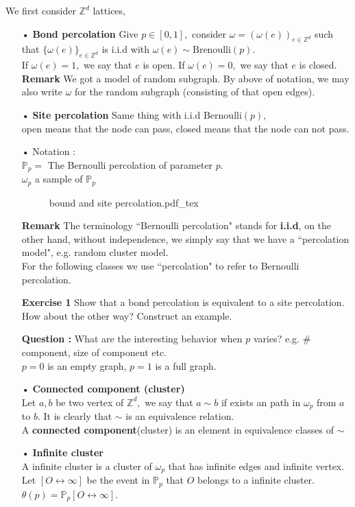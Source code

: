 \documentclass[12pt,a4paper]{article}
\newcommand{\incfig}[1]{%
{#1.pdf_tex}
}
\begin{document}
\begin{flushleft}
We first consider $\mathbb{Z}^d$ lattices,
\begin{enumerate}
	\item[•] \textbf{Bond percolation} Give $p\in [0,1],$ consider $\omega=(\omega(e))_{e\in\mathbb{Z}^d}$ such that $\{\omega(e)\}_{e\in\mathbb{Z}^d}$ is i.i.d with $\omega(e)\sim\mathrm{Brenoulli}(p).$\\
	If $\omega(e)=1,$ we say that $e$ is open. If $\omega(e)=0,$ we say that $e$ is closed.\\
	\textbf{Remark} We got a model of random subgraph. By above of notation, we may also write $\omega$ for the random subgraph (consisting of that open edges).
	\item[•] \textbf{Site percolation} Same thing with i.i.d $\mathrm{Bernoulli}(p),$\\
	open means that the node can pass, closed means that the node can not pass.
	\item[•] Notation : \\
	$\mathbb{P}_p=$ The Bernoulli percolation of parameter $p.$\\
	$\omega_p$ a sample of $\mathbb{P}_p$
	\begin{figure}[htp]
	\centering
	\def\svgwidth{15cm}
	\incfig{bound and site percolation}
	\end{figure}
	\item[\textbf{Remark}] The terminology ``Bernoulli percolation" stands for \textbf{i.i.d}, on the other hand, without independence, we simply say that we have a ``percolation model", e.g. random cluster model.\\
	For the following classes we use ``percolation" to refer to Bernoulli percolation.
	\item[\textbf{Exercise 1}] Show that a bond percolation is equivalent to a site percolation. How about the other way? Construct an example.
	\item[\textbf{Question :}] What are the interesting behavior when $p$ varies? e.g. \# component, size of component etc.\\
	$p=0$ is an empty graph, $p=1$ is a full graph. 
	\item[•] \textbf{Connected component (cluster)}\\
	Let $a,b$ be two vertex of $\mathbb{Z}^d,$ we say that $a\sim b$ if exists an path in $\omega_p$ from $a$ to $b$. It is clearly that $\sim$ is an equivalence relation. \\
	A \textbf{connected component}(cluster) is an element in equivalence classes of $\sim$ 
	\item[•] \textbf{Infinite cluster}\\
	A infinite cluster is a cluster of $\omega_p$ that has infinite edges and infinite vertex.\\
	Let $[O\leftrightarrow \infty]$ be the event in $\mathbb{P}_p$ that $O$ belongs to a infinite cluster.\\
	$\theta(p)=\mathbb{P}_p[O\leftrightarrow\infty].$
\end{enumerate}
\end{flushleft}
\end{document}
